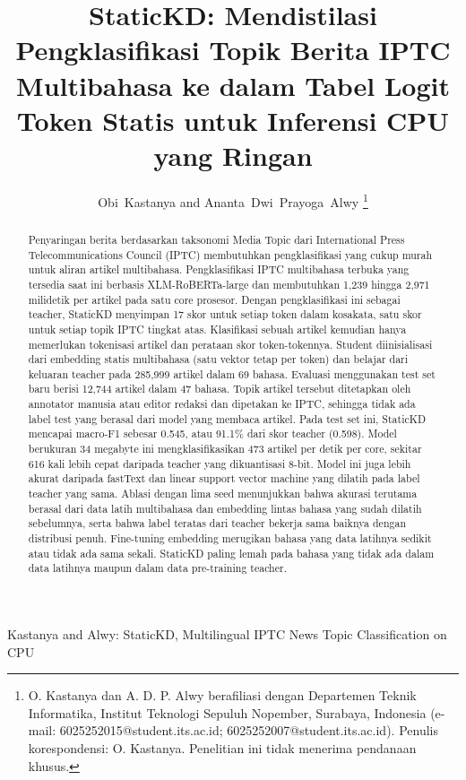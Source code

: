 \documentclass[journal]{IEEEtran}
\begin{document}
\title{StaticKD: Mendistilasi Pengklasifikasi Topik Berita IPTC Multibahasa ke dalam Tabel Logit Token Statis untuk Inferensi CPU yang Ringan}

\author{Obi~Kastanya and Ananta~Dwi~Prayoga~Alwy%
\thanks{O. Kastanya dan A. D. P. Alwy berafiliasi dengan Departemen Teknik Informatika, Institut Teknologi Sepuluh Nopember, Surabaya, Indonesia (e-mail: 6025252015@student.its.ac.id; 6025252007@student.its.ac.id). Penulis korespondensi: O. Kastanya. Penelitian ini tidak menerima pendanaan khusus.}}

%
{Kastanya and Alwy: StaticKD, Multilingual IPTC News Topic Classification on CPU}

\maketitle

\begin{abstract}
Penyaringan berita berdasarkan taksonomi Media Topic dari International Press Telecommunications Council (IPTC) membutuhkan pengklasifikasi yang cukup murah untuk aliran artikel multibahasa. Pengklasifikasi IPTC multibahasa terbuka yang tersedia saat ini berbasis XLM-RoBERTa-large dan membutuhkan 1,239 hingga 2,971 milidetik per artikel pada satu core prosesor. Dengan pengklasifikasi ini sebagai teacher, StaticKD menyimpan 17 skor untuk setiap token dalam kosakata, satu skor untuk setiap topik IPTC tingkat atas. Klasifikasi sebuah artikel kemudian hanya memerlukan tokenisasi artikel dan perataan skor token-tokennya. Student diinisialisasi dari embedding statis multibahasa (satu vektor tetap per token) dan belajar dari keluaran teacher pada 285,999 artikel dalam 69 bahasa. Evaluasi menggunakan test set baru berisi 12,744 artikel dalam 47 bahasa. Topik artikel tersebut ditetapkan oleh annotator manusia atau editor redaksi dan dipetakan ke IPTC, sehingga tidak ada label test yang berasal dari model yang membaca artikel. Pada test set ini, StaticKD mencapai macro-F1 sebesar 0.545, atau 91.1\% dari skor teacher (0.598). Model berukuran 34 megabyte ini mengklasifikasikan 473 artikel per detik per core, sekitar 616 kali lebih cepat daripada teacher yang dikuantisasi 8-bit. Model ini juga lebih akurat daripada fastText dan linear support vector machine yang dilatih pada label teacher yang sama. Ablasi dengan lima seed menunjukkan bahwa akurasi terutama berasal dari data latih multibahasa dan embedding lintas bahasa yang sudah dilatih sebelumnya, serta bahwa label teratas dari teacher bekerja sama baiknya dengan distribusi penuh. Fine-tuning embedding merugikan bahasa yang data latihnya sedikit atau tidak ada sama sekali. StaticKD paling lemah pada bahasa yang tidak ada dalam data latihnya maupun dalam data pre-training teacher.
\end{abstract}
\end{document}
